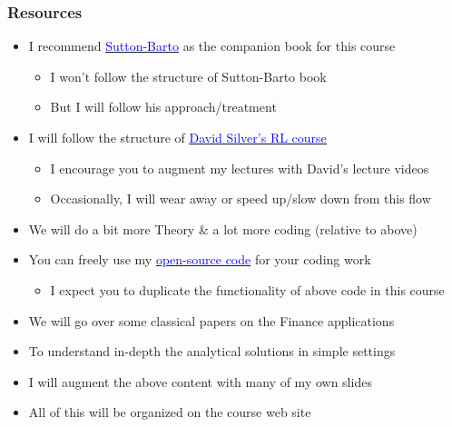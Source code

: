 \documentclass[handout]{beamer}
\begin{document}
\begin{frame}
\frametitle{Resources}
\pause
\begin{itemize}[<+->]
\item I recommend \href{http://incompleteideas.net/book/the-book-2nd.html}{\underline{\textcolor{blue}{Sutton-Barto}}} as the companion book for this course
\begin{itemize}
\item I won't follow the structure of Sutton-Barto book
\item But I will follow his approach/treatment
\end{itemize}
\item I will follow the structure of \href{http://www0.cs.ucl.ac.uk/staff/d.silver/web/Teaching.html}{\underline{\textcolor{blue}{David Silver's RL course}}}
\begin{itemize}
\item I encourage you to augment my lectures with David's lecture videos
\item Occasionally, I will wear away or speed up/slow down from this flow
\end{itemize}
\item We will do a bit more Theory \& a lot more coding (relative to above)
\item You can freely use my \href{https://github.com/coverdrive/MDP-DP-RL}{\underline{\textcolor{blue}{open-source code}}} for your coding work
\begin{itemize}
\item I expect you to duplicate the functionality of above code in this course
\end{itemize}
\item We will go over some classical papers on the Finance applications
\item To understand in-depth the analytical solutions in simple settings
\item I will augment the above content with many of my own slides
\item All of this will be organized on the course web site
\end{itemize}
\end{frame}
\end{document}
